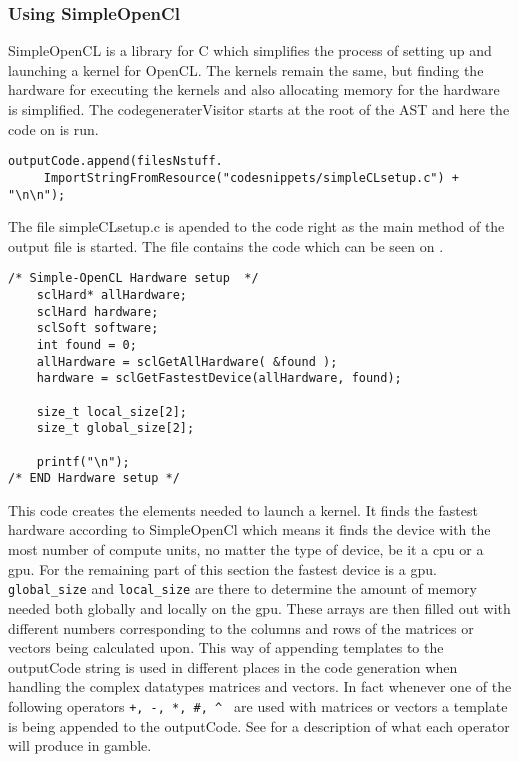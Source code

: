 \subsubsection*{Using SimpleOpenCl}
SimpleOpenCL is a library for C which simplifies the process of setting up and launching a kernel for OpenCL.
The kernels remain the same, but finding the hardware for executing the kernels and also allocating memory for the hardware is simplified.
The codegeneraterVisitor starts at the root of the AST and here the code on  is run.

\begin{lstlisting}[caption=Call to setup SimpleOpenCL in the compiler,numbers=none,frame=tlrb,label={lst:OpenCLSetup}]
outputCode.append(filesNstuff.
	 ImportStringFromResource("codesnippets/simpleCLsetup.c") + "\n\n");
\end{lstlisting}

The file simpleCLsetup.c is apended to the code right as the main method of the output file is started.
The file contains the code which can be seen on .

\begin{lstlisting}[caption=SimpleOpenCL setup in the compiler,numbers=none,frame=tlrb,label={lst:OpenCLSetup2}]
/* Simple-OpenCL Hardware setup  */
	sclHard* allHardware;
	sclHard hardware;
	sclSoft software;
	int found = 0;
	allHardware = sclGetAllHardware( &found );
	hardware = sclGetFastestDevice(allHardware, found);

    size_t local_size[2];
    size_t global_size[2];

    printf("\n");
/* END Hardware setup */
\end{lstlisting}

This code creates the elements needed to launch a kernel.
It finds the fastest hardware according to SimpleOpenCl which means it finds the device with the most number of compute units, no matter the type of device, be it a \acrshort{cpu} or a \acrshort{gpu}.
For the remaining part of this section the fastest device is a \acrshort{gpu}.
\texttt{global\_size} and \texttt{local\_size} are there to determine the amount of memory needed both globally and locally on the \acrshort{gpu}.
These arrays are then filled out with different numbers corresponding to the columns and rows of the matrices or vectors being calculated upon.
This way of appending templates to the outputCode string is used in different places in the code generation when handling the complex datatypes matrices and vectors.
In fact whenever one of the following operators \texttt{+, -, *, \#, \^{} } are used with matrices or vectors a template is being appended to the outputCode.
See  for a description of what each operator will produce in gamble.

